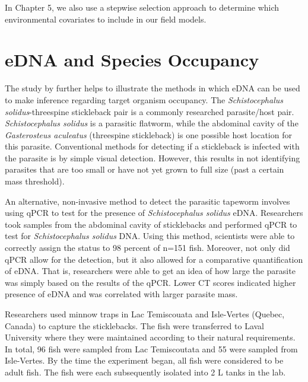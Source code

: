 \vspace{5mm}

In Chapter 5, we also use a stepwise selection approach to determine which environmental covariates to include in our field models.







\section{eDNA and Species Occupancy}
 
The study by \cite{parasite} further helps to illustrate the methods in which eDNA can be used to make inference regarding target organism occupancy. The \textit{Schistocephalus solidus}-threespine stickleback pair is a commonly researched parasite/host pair. \textit{Schistocephalus solidus} is a parasitic flatworm, while the abdominal cavity of the  \textit{Gasterosteus aculeatus} (threespine stickleback) is one possible host location for this parasite. Conventional  methods for detecting if a stickleback is infected with the parasite is by simple visual detection. However, this results in not identifying parasites that are too small or have not yet grown to full size (past a certain mass threshold). 


\vspace{5mm}

An alternative, non-invasive method to detect the parasitic tapeworm involves using qPCR to test for the presence of \textit{Schistocephalus solidus} eDNA. Researchers took samples from the abdominal cavity of sticklebacks and performed qPCR to test for \textit{Schistocephalus solidus} DNA. Using this method, scientists were able to correctly assign the status to 98 percent of n=151 fish.
Moreover, not only did qPCR allow for the detection, but it also allowed for a comparative quantification of eDNA. That is, researchers were able to get an idea of how large the parasite was simply based on the results of the qPCR. Lower CT scores indicated higher presence of eDNA and was correlated with larger parasite mass. 

\vspace{6mm}

Researchers used minnow traps in Lac Temiscouata and Isle-Vertes (Quebec, Canada) to capture the sticklebacks. The fish were transferred to Laval University where they were maintained according to their natural requirements. In total, 96 fish were sampled from Lac Temiscoutata and 55 were sampled from Isle-Vertes. By the time the experiment began, all fish were considered to be adult fish. The fish were each subsequently isolated into 2 L tanks in the lab.

